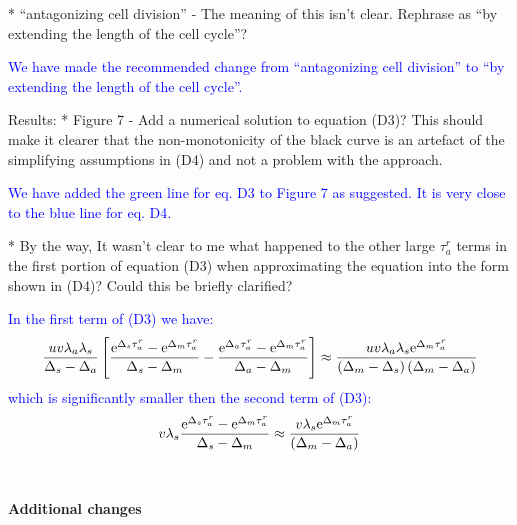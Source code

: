 \documentclass[12pt]{extarticle}
\newcommand{\e}{{\rm e}}
\begin{document}
* ``antagonizing cell division'' - The meaning of this isn't clear. Rephrase as ``by extending the length of the cell cycle''?

\textcolor{blue}{We have made the recommended change from ``antagonizing cell division'' to ``by extending the length of the cell cycle''.}  %

Results:
* Figure 7 - Add a numerical solution to equation (D3)? This should make it clearer that the non-monotonicity of the black curve is an artefact of the simplifying assumptions in (D4) and not a problem with the approach.

\textcolor{blue}{We have added the green line for eq. D3 to Figure 7 as suggested. It is very close to the blue line for eq. D4.}

* By the way, It wasn't clear to me what happened to the other large $\tau_a^r$ terms in the first portion of equation (D3) when approximating the equation into the form shown in (D4)? Could this be briefly clarified?

\textcolor{blue}{In the first term of (D3) we have: 
\begin{align*}
\frac{uv\lambda_a\lambda_s}{\Delta_s-\Delta_a}\left[\frac{\e^{\Delta_s\tau_a^r}-\e^{\Delta_m\tau_a^r}}{\Delta_s-\Delta_m}-\frac{\e^{\Delta_a\tau_a^r}-\e^{\Delta_m\tau_a^r}}{\Delta_a-\Delta_m}\right]\approx\frac{uv\lambda_a\lambda_s\e^{\Delta_m\tau_a^r}}{\left(\Delta_m-\Delta_s\right)\left(\Delta_m-\Delta_a\right)}
\end{align*}
which is significantly smaller then the second term of (D3):
\begin{align*}
v\lambda_s\frac{\e^{\Delta_s\tau_a^r}-\e^{\Delta_m\tau_a^r}}{\Delta_s-\Delta_m}\approx\frac{v\lambda_s\e^{\Delta_m\tau_a^r}}{\left(\Delta_m-\Delta_a\right)}
\end{align*}
} %
\\
\\

\textbf{Additional changes}
\end{document}
